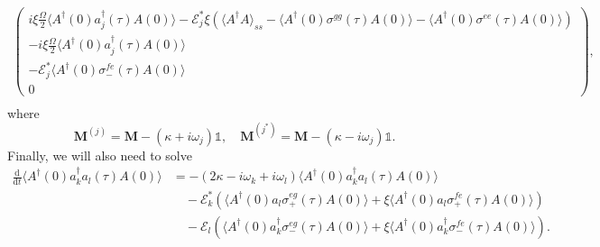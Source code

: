 \documentclass{article}
\newcommand{\ddt}{\frac{\mathrm{d}}{\mathrm{d}t}}
\begin{document}
\begin{subequations}
\begin{align}
\begin{pmatrix}
			i \xi \frac{\Omega}{2} \langle A^{\dagger}(0) a_{j}^{\dagger}(\tau) A(0) \rangle - \mathcal{E}_{j}^{*} \xi \left( \langle A^{\dagger} A \rangle_{ss} - \langle A^{\dagger}(0) \sigma^{gg}(\tau) A(0) \rangle - \langle A^{\dagger}(0) \sigma^{ee}(\tau) A(0) \rangle \right) \\
			-i \xi \frac{\Omega}{2} \langle A^{\dagger}(0) a_{j}^{\dagger}(\tau) A(0) \rangle \\
			-\mathcal{E}_{j}^{*} \langle A^{\dagger}(0) \sigma^{fe}_{-}(\tau) A(0) \rangle \\
			0
		\end{pmatrix} , \\
	\end{align}
\end{subequations}
where
\begin{equation}
	\bm{M}^{(j)} = \bm{M} - \left( \kappa + i \omega_{j} \right) \mathbb{1}, \quad \bm{M}^{(j^{*})} = \bm{M} - \left( \kappa - i \omega_{j} \right) \mathbb{1}.
\end{equation}
Finally, we will also need to solve
\begin{align}
	\ddt \langle A^{\dagger}(0) a^{\dagger}_{k} a_{l}(\tau) A(0) \rangle &= -\left( 2 \kappa - i \omega_{k} + i \omega_{l} \right) \langle A^{\dagger}(0) a^{\dagger}_{k} a_{l}(\tau) A(0) \rangle \nonumber \\
	&\quad -\mathcal{E}_{k}^{*} \left( \langle A^{\dagger}(0) a_{l} \sigma^{eg}_{+}(\tau) A(0) \rangle + \xi \langle A^{\dagger}(0) a_{l} \sigma^{fe}_{+}(\tau) A(0) \rangle \right) \nonumber \\
	&\quad - \mathcal{E}_{l} \left( \langle A^{\dagger}(0) a_{k}^{\dagger} \sigma^{eg}_{-}(\tau) A(0) \rangle + \xi \langle A^{\dagger}(0) a_{k}^{\dagger} \sigma^{fe}_{-}(\tau) A(0) \rangle \right).
\end{align}
\end{document}
